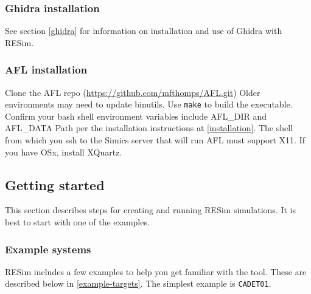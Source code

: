 \documentclass[titlepage]{article}
\begin{document}
\subsubsection{Ghidra installation}
See section \ref{ghidra} for information on installation and use of Ghidra with RESim.

\subsubsection{AFL installation}
Clone the AFL repo (\url{https://github.com/mfthomps/AFL.git})   Older environments may need to update binutils. Use {\tt make} to build the executable.
Confirm your bash shell environment variables include AFL\_DIR and AFL\_DATA Path per the installation instructions at \ref{installation}.
The shell from which you ssh to the Simics server that will run AFL must support X11.  If you have OSx, install XQuartz.

\subsection{Getting started}
\label{getting-started}
This section describes steps for creating and running RESim simulations.
It is best to start with one of the examples.

\subsubsection{Example systems}
RESim includes a few examples to help you get familiar with the tool. These are described below in \ref{example-targets}. 
The simplest example is {\tt CADET01}.  
\end{document}

